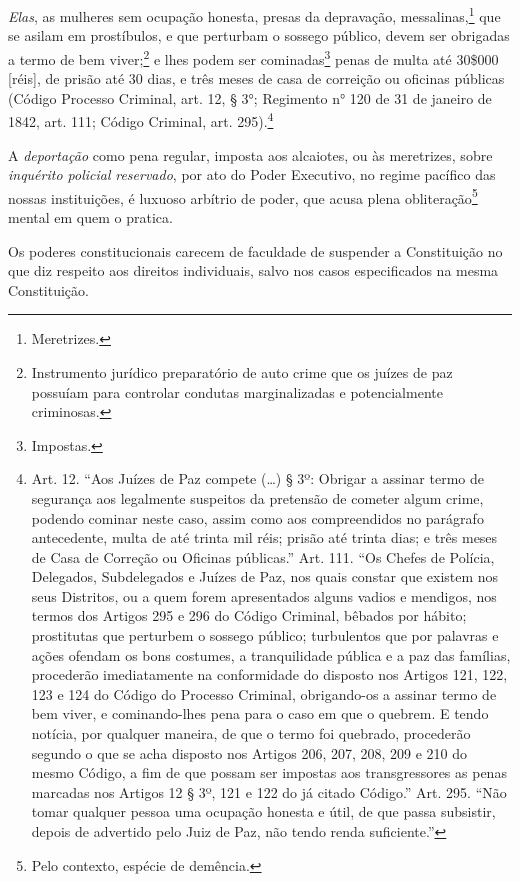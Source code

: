 \emph{Elas}, as mulheres sem ocupação honesta, presas da depravação,
messalinas,\footnote{Meretrizes.} que se asilam em prostíbulos, e que
perturbam o sossego público, devem ser obrigadas a termo de bem
viver;\footnote{Instrumento jurídico preparatório de auto crime que os
  juízes de paz possuíam para controlar condutas marginalizadas e
  potencialmente criminosas.} e lhes podem ser cominadas\footnote{
  Impostas.} penas de multa até 30\$000 {[}réis{]}, de prisão até 30 %
dias, e três meses de casa de correição ou oficinas públicas
(Código Processo Criminal, art. 12, § 3°;
Regimento n° 120 de 31 de janeiro de 1842, art. 111; Código
Criminal, art. 295).\footnote{Art. 12. ``Aos Juízes de Paz
  compete (\ldots{}) § 3º: Obrigar a assinar termo de segurança aos
  legalmente suspeitos da pretensão de cometer algum crime, podendo
  cominar neste caso, assim como aos compreendidos no parágrafo
  antecedente, multa de até trinta mil réis; prisão até trinta
  dias; e três meses de Casa de Correção ou Oficinas públicas.''
  Art. 111. ``Os Chefes de Polícia, Delegados, Subdelegados e Juízes de
  Paz, nos quais constar que existem nos seus Distritos, ou a quem forem
  apresentados alguns vadios e mendigos, nos termos dos Artigos 295 e
  296 do Código Criminal, bêbados por hábito; prostitutas que perturbem
  o sossego público; turbulentos que por palavras e ações ofendam os
  bons costumes, a tranquilidade pública e a paz das famílias,
  procederão imediatamente na conformidade do disposto nos Artigos 121,
  122, 123 e 124 do Código do Processo Criminal, obrigando-os a assinar
  termo de bem viver, e cominando-lhes pena para o caso em que o
  quebrem. E tendo notícia, por qualquer maneira, de que o termo foi
  quebrado, procederão segundo o que se acha disposto nos Artigos 206,
  207, 208, 209 e 210 do mesmo Código, a fim de que possam ser impostas
  aos transgressores as penas marcadas nos Artigos 12 § 3º, 121 e 122 do
  já citado Código.'' Art. 295. ``Não tomar qualquer pessoa uma ocupação
  honesta e útil, de que passa subsistir, depois de advertido pelo Juiz
  de Paz, não tendo renda suficiente.''}

A \emph{deportação} como pena regular, imposta aos alcaiotes, ou às
meretrizes, sobre \emph{inquérito policial} \emph{reservado}, por ato do
Poder Executivo, no regime pacífico das nossas instituições, é luxuoso
arbítrio de poder, que acusa plena obliteração\footnote{Pelo contexto,
  espécie de demência.} mental em quem o pratica.

Os poderes constitucionais carecem de faculdade de suspender a
Constituição no que diz respeito aos direitos individuais, salvo nos
casos especificados na mesma Constituição.

